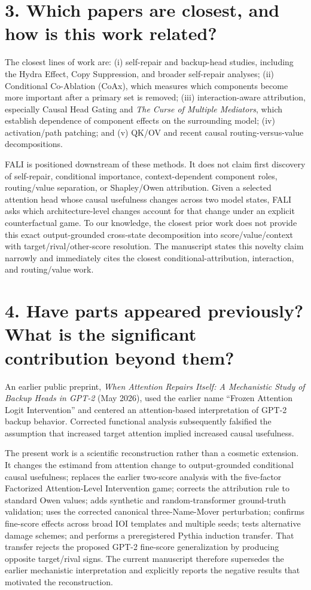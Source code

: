 \documentclass[11pt]{article}
\begin{document}
\section*{3. Which papers are closest, and how is this work related?}

The closest lines of work are: (i) self-repair and backup-head studies, including the Hydra Effect, Copy Suppression, and broader self-repair analyses; (ii) Conditional Co-Ablation (CoAx), which measures which components become more important after a primary set is removed; (iii) interaction-aware attribution, especially Causal Head Gating and \emph{The Curse of Multiple Mediators}, which establish dependence of component effects on the surrounding model; (iv) activation/path patching; and (v) QK/OV and recent causal routing-versus-value decompositions.

FALI is positioned downstream of these methods. It does not claim first discovery of self-repair, conditional importance, context-dependent component roles, routing/value separation, or Shapley/Owen attribution. Given a selected attention head whose causal usefulness changes across two model states, FALI asks which architecture-level changes account for that change under an explicit counterfactual game. To our knowledge, the closest prior work does not provide this exact output-grounded cross-state decomposition into score/value/context with target/rival/other-score resolution. The manuscript states this novelty claim narrowly and immediately cites the closest conditional-attribution, interaction, and routing/value work.

\section*{4. Have parts appeared previously? What is the significant contribution beyond them?}

An earlier public preprint, \emph{When Attention Repairs Itself: A Mechanistic Study of Backup Heads in GPT-2} (May 2026), used the earlier name ``Frozen Attention Logit Intervention'' and centered an attention-based interpretation of GPT-2 backup behavior. Corrected functional analysis subsequently falsified the assumption that increased target attention implied increased causal usefulness.

The present work is a scientific reconstruction rather than a cosmetic extension. It changes the estimand from attention change to output-grounded conditional causal usefulness; replaces the earlier two-score analysis with the five-factor Factorized Attention-Level Intervention game; corrects the attribution rule to standard Owen values; adds synthetic and random-transformer ground-truth validation; uses the corrected canonical three-Name-Mover perturbation; confirms fine-score effects across broad IOI templates and multiple seeds; tests alternative damage schemes; and performs a preregistered Pythia induction transfer. That transfer rejects the proposed GPT-2 fine-score generalization by producing opposite target/rival signs. The current manuscript therefore supersedes the earlier mechanistic interpretation and explicitly reports the negative results that motivated the reconstruction.
\end{document}
